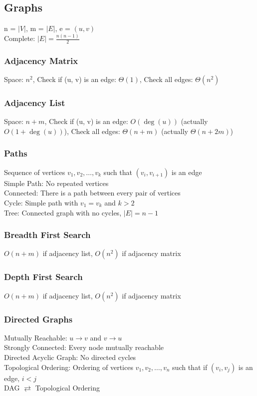 \documentclass{article}
\begin{document}
\begin{multicols*}{2}
        \subsection*{Graphs}
        n = $\rvert V \lvert$, m = $\rvert E \lvert$, e = $(u, v)$\\
        Complete: $\lvert E \rvert = \frac{n(n - 1)}{2}$
        \subsubsection*{Adjacency Matrix}
        Space: $n^2$, Check if (u, v) is an edge: $\Theta(1)$, Check all edges: $\Theta(n^2)$
        \subsubsection*{Adjacency List}
        Space: $n + m$, Check if (u, v) is an edge: $O(\deg(u))$ (actually $O(1 + \deg(u))$), Check
        all edges: $\Theta(n + m)$ (actually $\Theta(n + 2m)$)
        \subsubsection*{Paths}
        Sequence of vertices $v_1, v_2, \dots, v_k$ such that $(v_i, v_{i+1})$ is an edge\\
        Simple Path: No repeated vertices\\
        Connected: There is a path between every pair of vertices\\
        Cycle: Simple path with $v_1 = v_k$ and $k > 2$\\
        Tree: Connected graph with no cycles, $\lvert E \rvert = n - 1$
        \subsubsection*{Breadth First Search}
        $O(n + m)$ if adjacency list, $O(n^2)$ if adjacency matrix
        \subsubsection*{Depth First Search}
        $O(n + m)$ if adjacency list, $O(n^2)$ if adjacency matrix
        \subsubsection*{Directed Graphs}
        Mutually Reachable: $u \to v$ and $v \to u$\\
        Strongly Connected: Every node mutually reachable\\
        Directed Acyclic Graph: No directed cycles\\
        Topological Ordering: Ordering of vertices $v_1, v_2, \ldots, v_n$ such that if $(v_i,
        v_j)$ is an edge, $i < j$\\
        DAG $\rightleftarrows$ Topological Ordering

\end{multicols*}
\end{document}
